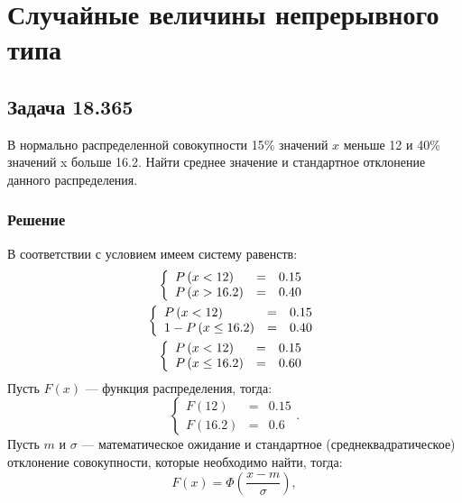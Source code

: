 \chapter{Случайные величины непрерывного типа}


\section*{Задача 18.365}

В нормально распределенной совокупности 15\% значений $x$ меньше 12 и 40\% значений x больше 16.2. Найти среднее значение и стандартное отклонение данного распределения.
\subsection*{Решение}
В соответствии с условием имеем систему равенств:
\begin{gather}
    \left \{
    \begin{array}{lcl}
        P \left ( x < 12 \right )   & = & 0.15 \\
        P \left ( x > 16.2 \right ) & = & 0.40
    \end{array}
    \right . \\
    \left \{
    \begin{array}{lcl}
        P \left ( x < 12 \right )         & = & 0.15 \\
        1 - P \left ( x \le 16.2 \right ) & = & 0.40
    \end{array}
    \right . \\
    \left \{
    \begin{array}{lcl}
        P \left ( x < 12 \right )     & = & 0.15 \\
        P \left ( x \le 16.2 \right ) & = & 0.60
    \end{array}
    \right .
\end{gather}
Пусть $F(x)$ --- функция распределения, тогда:
\begin{equation}
    \label{365:system}
    \left \{
    \begin{array}{lcl}
        F(12)   & = & 0.15 \\
        F(16.2) & = & 0.6
    \end{array}
    \right .
    .
\end{equation}
Пусть $m$ и $\sigma$ --- математическое ожидание и стандартное (среднеквадратическое) отклонение совокупности, которые необходимо найти, тогда:
\begin{equation}
    \label{365:F}
    F(x) = \Phi \left ( \frac{x - m}{\sigma} \right ),
\end{equation}
